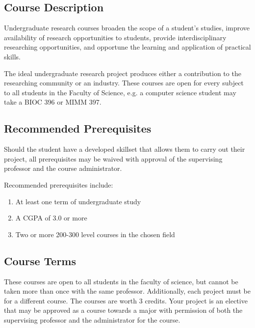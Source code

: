 \begin{Form}
\maketitle

\section*{Course Description}

	Undergraduate research courses broaden the scope of a student's studies, improve availability of research opportunities to students, provide interdisciplinary researching opportunities, and opportune the learning and application of practical skills.
	
	The ideal undergraduate research project produces either a contribution to the researching community or an industry.
	These courses are open for every subject to all students in the Faculty of Science, e.g. a computer science student may take a BIOC 396 or MIMM 397.

\subsection*{Recommended Prerequisites}

	Should the student have a developed skillset that allows them to carry out their project, all prerequisites may be waived with approval of the supervising professor and the course administrator.
	
	Recommended prerequisites include:
	\begin{enumerate}
		\item At least one term of undergraduate study
		\item A CGPA of 3.0 or more
		\item Two or more 200-300 level courses in the chosen field
	\end{enumerate}

\subsection*{Course Terms}

		These courses are open to all students in the faculty of science, but cannot be taken more than once with the same professor.
		Additionally, each project must be for a different course.
		The courses are worth 3 credits.
		Your project is an elective that may be approved as a course towards a major with permission of both the supervising professor and the administrator for the course.
		

\end{Form}

